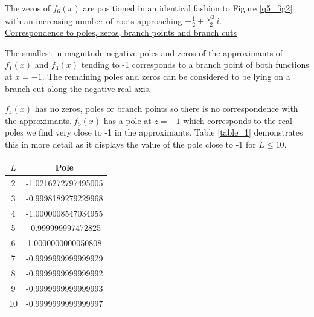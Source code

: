 \documentclass[12pt, a4paper]{article}
\begin{document}
The zeros of $f_{6}(x)$ are positioned in an identical fashion to Figure \ref{q5_fig2} with an increasing 
number of roots approaching $-\frac{1}{2} \pm \frac{\sqrt{3}}{2}i$. 
\\

\vspace{0.4cm}
\underline{Correspondence to poles, zeros, branch points and branch cuts}

\vspace{0.5cm}
The smallest in magnitude negative poles and zeros of the approximants of $f_{1}(x)$ and 
$f_{3}(x)$ tending to -1 corresponds to a branch point of both functions at $x=-1$. The 
remaining poles and zeros can be considered to be lying on a branch cut along the negative 
real axis.
\\

\begin{minipage}{0.45\textwidth}
$f_{4}(x)$ has no zeros, poles or branch points so there is no correspondence with the 
approximants.$~f_{5}(x)$ has a pole at $z = -1$ which corresponds to the real poles we 
find very close to -1 in the approximants. Table \ref{table_1} demonstrates this in more 
detail as it displays the value of the pole close to -1 for $L \leq 10$.
\end{minipage}
\hspace{0.05\textwidth}
\begin{minipage}{0.49\textwidth}
	\centering
	\renewcommand{\arraystretch}{1.2}
	\begin{tabular}{|l|l|}
		\hline
		\multicolumn{1}{|c|}{$L$} & \multicolumn{1}{c|}{Pole}               \\ \hline
		\multicolumn{1}{|c|}{2}   & \multicolumn{1}{c|}{-1.0216272797495005} \\ \hline
		\multicolumn{1}{|c|}{3}   & \multicolumn{1}{c|}{-0.9998189279229968} \\ \hline
		\multicolumn{1}{|c|}{4}   & \multicolumn{1}{c|}{-1.0000008547034955} \\ \hline
		\multicolumn{1}{|c|}{5}   & \multicolumn{1}{c|}{-0.999999997472825}  \\ \hline
		\multicolumn{1}{|c|}{6}   & \multicolumn{1}{|c|}{1.0000000000050808}	\\ \hline
		\multicolumn{1}{|c|}{7}   & \multicolumn{1}{|c|}{-0.9999999999999929}   \\ \hline
		\multicolumn{1}{|c|}{8}   & \multicolumn{1}{|c|}{-0.9999999999999992}   \\ \hline
		\multicolumn{1}{|c|}{9}   & \multicolumn{1}{|c|}{-0.9999999999999993}   \\ \hline
		10                        & \multicolumn{1}{|c|}{-0.9999999999999997}   \\ \hline

	\end{tabular}

	\vspace*{-0.2cm}

	\label{table_1}
\end{minipage}
\\
\end{document}
